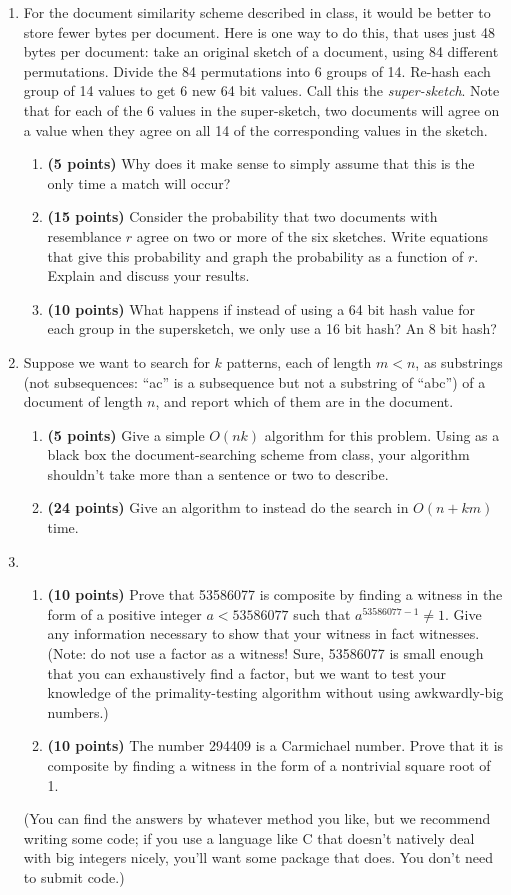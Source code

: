 \documentclass[10pt]{article}
\begin{document}
\begin{enumerate}
\item 
For the document similarity scheme described in class, it would
be better to store fewer bytes per document.  Here is one way to do
this, that uses just 48 bytes per document: take an original sketch of
a document, using 84 different permutations.  Divide the 84
permutations into 6 groups of 14.  Re-hash each group of 14 values to
get 6 new 64 bit values.  Call this the {\em super-sketch}.  Note that
for each of the 6 values in the super-sketch, two documents will agree
on a value when they agree on all 14 of the corresponding values in
the sketch. 
\begin{enumerate}
\item 
{\bf (5 points)}
Why does it make sense to simply assume that this is the
only time a match will occur?
\item 
{\bf (15 points)}
Consider the probability that two documents with resemblance 
$r$ agree on two or more of the six sketches.  Write equations
that give this probability and graph the probability as a function
of $r$.  Explain and discuss your results.
\item 
{\bf (10 points)}
What happens if instead of using a 64 bit hash value for each
group in the supersketch, we only use a 16 bit hash?  An 8 bit hash?
\end{enumerate}

 \item 
Suppose we want to search for $k$ patterns, each of length $m<n$, 
as substrings (not subsequences: ``ac'' is a subsequence but not a substring of ``abc'') of a document of length $n$, and report which
of them are in the document.
\begin{enumerate}
\item
{\bf (5 points)}
Give a simple $O(nk)$ algorithm for this problem. Using as a black box the document-searching scheme from class, your algorithm shouldn't take more than a sentence or two to describe.
\item
{\bf (24 points)}
Give an algorithm to instead do the search in $O(n+km)$ time. 
\end{enumerate}

\item 
\begin{enumerate}
\item 
{\bf (10 points)}
Prove that 53586077 is composite 
by finding a witness in the form of 
a positive integer $a < 53586077$ such that 
$a^{53586077-1} \neq 1$.
Give any information necessary to show that your witness
in fact witnesses.  (Note: do not use a factor as a witness!
Sure, 53586077 is small enough that you can exhaustively find a
factor, but we want to test your knowledge of the primality-testing
algorithm without using awkwardly-big numbers.)
\item 
{\bf (10 points)}
The number 294409 is a Carmichael number.  Prove that it is composite
by finding a witness in the form of a nontrivial square root of 1. 
\end{enumerate}
(You can find the answers by whatever method you like, but we recommend
writing some code; if you use a language like C that doesn't natively deal
with big integers nicely, you'll want some package that does.
You don't need to submit code.)



\end{enumerate}
\end{document}
